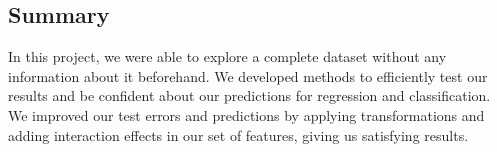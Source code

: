 \documentclass{article} %
\begin{document}
\subsection{Summary}

In this project, we were able to explore a complete dataset without any information about it beforehand. We developed methods to efficiently test our results and be confident about our predictions for regression and classification. We improved our test errors and predictions by applying transformations and adding interaction effects in our set of features, giving us satisfying results. 
\end{document}
